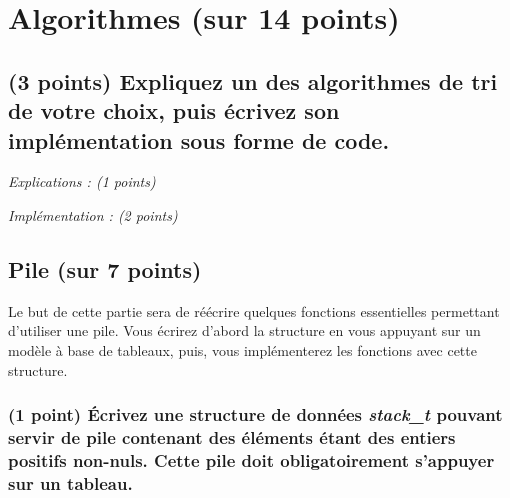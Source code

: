 \documentclass[11pt,a4paper]{article}
\begin{document}
\clearpage


\section{Algorithmes (sur 14 points)}

%

\subsection{(3 points) Expliquez un des algorithmes de tri de votre choix, puis écrivez son implémentation sous forme de code. }

\textit{Explications : (1 points)}

\begin{center}
\end{center}


\textit{Implémentation : (2 points)}

\begin{center}
\end{center}


\clearpage


\subsection{Pile (sur 7 points)}

\noindent Le but de cette partie sera de réécrire quelques fonctions essentielles permettant d'utiliser une pile.
Vous écrirez d'abord la structure en vous appuyant sur un modèle à base de tableaux, puis, vous implémenterez les fonctions avec cette structure.

\subsubsection{(1 point) \'Ecrivez une structure de données \og \textit{stack\_t} \fg{} pouvant servir de pile contenant des éléments étant des entiers positifs non-nuls. Cette pile doit obligatoirement s'appuyer sur un tableau. }
\end{document}
